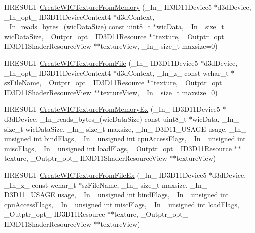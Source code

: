 \begin{DoxyCompactItemize}
\item 
H\+R\+E\+S\+U\+LT \hyperlink{namespace_direct_x_aff3b249c5f1217b31bea45c5b9540efd}{Create\+W\+I\+C\+Texture\+From\+Memory} (\+\_\+\+In\+\_\+ I\+D3\+D11\+Device5 $\ast$d3d\+Device, \+\_\+\+In\+\_\+opt\+\_\+ I\+D3\+D11\+Device\+Context4 $\ast$d3d\+Context, \+\_\+\+In\+\_\+reads\+\_\+bytes\+\_\+(wic\+Data\+Size) const uint8\+\_\+t $\ast$wic\+Data, \+\_\+\+In\+\_\+ size\+\_\+t wic\+Data\+Size, \+\_\+\+Outptr\+\_\+opt\+\_\+ I\+D3\+D11\+Resource $\ast$$\ast$texture, \+\_\+\+Outptr\+\_\+opt\+\_\+ I\+D3\+D11\+Shader\+Resource\+View $\ast$$\ast$texture\+View, \+\_\+\+In\+\_\+ size\+\_\+t maxsize=0)
\item 
H\+R\+E\+S\+U\+LT \hyperlink{namespace_direct_x_a2d8b2e93c7c8432d136f217d22e52ab3}{Create\+W\+I\+C\+Texture\+From\+File} (\+\_\+\+In\+\_\+ I\+D3\+D11\+Device5 $\ast$d3d\+Device, \+\_\+\+In\+\_\+opt\+\_\+ I\+D3\+D11\+Device\+Context4 $\ast$d3d\+Context, \+\_\+\+In\+\_\+z\+\_\+ const wchar\+\_\+t $\ast$sz\+File\+Name, \+\_\+\+Outptr\+\_\+opt\+\_\+ I\+D3\+D11\+Resource $\ast$$\ast$texture, \+\_\+\+Outptr\+\_\+opt\+\_\+ I\+D3\+D11\+Shader\+Resource\+View $\ast$$\ast$texture\+View, \+\_\+\+In\+\_\+ size\+\_\+t maxsize=0)
\item 
H\+R\+E\+S\+U\+LT \hyperlink{namespace_direct_x_aa31ce1bc2465bbad0428dd1fb04665a3}{Create\+W\+I\+C\+Texture\+From\+Memory\+Ex} (\+\_\+\+In\+\_\+ I\+D3\+D11\+Device5 $\ast$d3d\+Device, \+\_\+\+In\+\_\+reads\+\_\+bytes\+\_\+(wic\+Data\+Size) const uint8\+\_\+t $\ast$wic\+Data, \+\_\+\+In\+\_\+ size\+\_\+t wic\+Data\+Size, \+\_\+\+In\+\_\+ size\+\_\+t maxsize, \+\_\+\+In\+\_\+ D3\+D11\+\_\+\+U\+S\+A\+GE usage, \+\_\+\+In\+\_\+ unsigned int bind\+Flags, \+\_\+\+In\+\_\+ unsigned int cpu\+Access\+Flags, \+\_\+\+In\+\_\+ unsigned int misc\+Flags, \+\_\+\+In\+\_\+ unsigned int load\+Flags, \+\_\+\+Outptr\+\_\+opt\+\_\+ I\+D3\+D11\+Resource $\ast$$\ast$texture, \+\_\+\+Outptr\+\_\+opt\+\_\+ I\+D3\+D11\+Shader\+Resource\+View $\ast$$\ast$texture\+View)
\item 
H\+R\+E\+S\+U\+LT \hyperlink{namespace_direct_x_accf7c30e061127ed3177299d7c34bf88}{Create\+W\+I\+C\+Texture\+From\+File\+Ex} (\+\_\+\+In\+\_\+ I\+D3\+D11\+Device5 $\ast$d3d\+Device, \+\_\+\+In\+\_\+z\+\_\+ const wchar\+\_\+t $\ast$sz\+File\+Name, \+\_\+\+In\+\_\+ size\+\_\+t maxsize, \+\_\+\+In\+\_\+ D3\+D11\+\_\+\+U\+S\+A\+GE usage, \+\_\+\+In\+\_\+ unsigned int bind\+Flags, \+\_\+\+In\+\_\+ unsigned int cpu\+Access\+Flags, \+\_\+\+In\+\_\+ unsigned int misc\+Flags, \+\_\+\+In\+\_\+ unsigned int load\+Flags, \+\_\+\+Outptr\+\_\+opt\+\_\+ I\+D3\+D11\+Resource $\ast$$\ast$texture, \+\_\+\+Outptr\+\_\+opt\+\_\+ I\+D3\+D11\+Shader\+Resource\+View $\ast$$\ast$texture\+View)

\end{DoxyCompactItemize}
